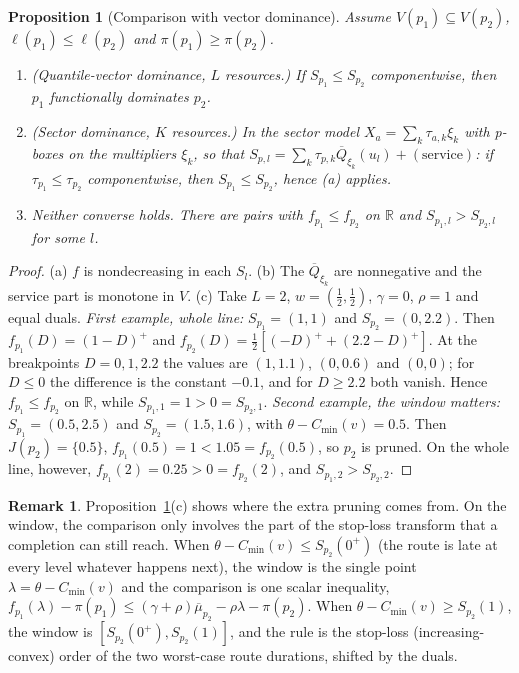 \documentclass[11pt]{article}
\newtheorem{proposition}[theorem]{Proposition}
\theoremstyle{definition}
\newtheorem{remark}[theorem]{Remark}
\newcommand{\R}{\mathbb{R}}
\newcommand{\Qb}{\overline{Q}}
\newcommand{\mub}{\overline{\mu}}
\newcommand{\pos}[1]{\left(#1\right)^{+}}
\begin{document}
\begin{proposition}[Comparison with vector dominance]\label{prop:compare}
Assume $V(p_1)\subseteq V(p_2)$, $\ell(p_1)\le\ell(p_2)$ and $\pi(p_1)\ge\pi(p_2)$.
\begin{enumerate}[label=(\alph*)]
\item (Quantile-vector dominance, $L$ resources.) If $S_{p_1}\le S_{p_2}$ componentwise, then $p_1$ functionally dominates $p_2$.
\item (Sector dominance, $K$ resources.) In the sector model $X_a=\sum_k\tau_{a,k}\xi_k$ with p-boxes on the multipliers $\xi_k$, so that $S_{p,l}=\sum_k\tau_{p,k}\Qb_{\xi_k}(u_l)+(\text{service})$: if $\tau_{p_1}\le\tau_{p_2}$ componentwise, then $S_{p_1}\le S_{p_2}$, hence (a) applies.
\item Neither converse holds. There are pairs with $f_{p_1}\le f_{p_2}$ on $\R$ and $S_{p_1,l}>S_{p_2,l}$ for some $l$.
\end{enumerate}
\end{proposition}
\begin{proof}
(a) $f$ is nondecreasing in each $S_l$. (b) The $\Qb_{\xi_k}$ are nonnegative and the service part is monotone in $V$.
(c) Take $L=2$, $w=(\tfrac12,\tfrac12)$, $\gamma=0$, $\rho=1$ and equal duals.
\emph{First example, whole line:} $S_{p_1}=(1,1)$ and $S_{p_2}=(0,2.2)$. Then $f_{p_1}(D)=\pos{1-D}$ and $f_{p_2}(D)=\tfrac12[\pos{-D}+\pos{2.2-D}]$. At the breakpoints $D=0,1,2.2$ the values are $(1,1.1)$, $(0,0.6)$ and $(0,0)$; for $D\le0$ the difference is the constant $-0.1$, and for $D\ge2.2$ both vanish. Hence $f_{p_1}\le f_{p_2}$ on $\R$, while $S_{p_1,1}=1>0=S_{p_2,1}$.
\emph{Second example, the window matters:} $S_{p_1}=(0.5,2.5)$ and $S_{p_2}=(1.5,1.6)$, with $\theta-C_{\min}(v)=0.5$. Then $J(p_2)=\{0.5\}$, $f_{p_1}(0.5)=1<1.05=f_{p_2}(0.5)$, so $p_2$ is pruned. On the whole line, however, $f_{p_1}(2)=0.25>0=f_{p_2}(2)$, and $S_{p_1,2}>S_{p_2,2}$.
\end{proof}

\begin{remark}
Proposition~\ref{prop:compare}(c) shows where the extra pruning comes from. On the window, the comparison only involves the part of the stop-loss transform that a completion can still reach. When $\theta-C_{\min}(v)\le S_{p_2}(0^+)$ (the route is late at every level whatever happens next), the window is the single point $\lambda=\theta-C_{\min}(v)$ and the comparison is one scalar inequality, $f_{p_1}(\lambda)-\pi(p_1)\le(\gamma+\rho)\mub_{p_2}-\rho\lambda-\pi(p_2)$. When $\theta-C_{\min}(v)\ge S_{p_2}(1)$, the window is $[S_{p_2}(0^+),S_{p_2}(1)]$, and the rule is the stop-loss (increasing-convex) order of the two worst-case route durations, shifted by the duals.
\end{remark}
\end{document}
